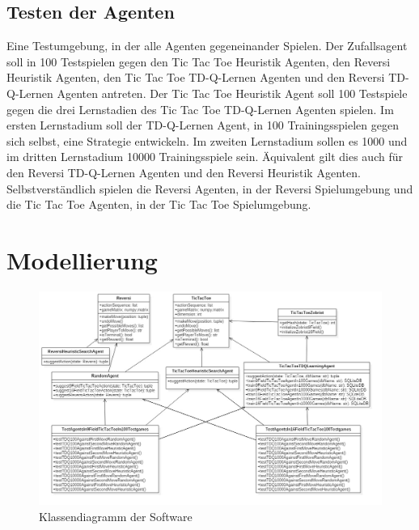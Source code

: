 \subsection{Testen der Agenten}
Eine Testumgebung, in der alle Agenten gegeneinander Spielen. Der Zufallsagent soll in 100 Testspielen gegen den Tic Tac Toe Heuristik Agenten, den Reversi Heuristik Agenten, den Tic Tac Toe TD-Q-Lernen Agenten und den Reversi TD-Q-Lernen Agenten antreten. Der Tic Tac Toe Heuristik Agent soll 100 Testspiele gegen die drei Lernstadien des Tic Tac Toe TD-Q-Lernen Agenten spielen. Im ersten Lernstadium soll der TD-Q-Lernen Agent, in 100 Trainingsspielen gegen sich selbst, eine Strategie entwickeln. Im zweiten Lernstadium sollen es 1000 und im dritten Lernstadium 10000 Trainingsspiele sein. Äquivalent gilt dies auch für den Reversi TD-Q-Lernen Agenten und den Reversi Heuristik Agenten. Selbstverständlich spielen die Reversi Agenten, in der Reversi Spielumgebung und die Tic Tac Toe Agenten, in der Tic Tac Toe Spielumgebung.
\newpage

\section{Modellierung}

\begin{figure}[!htbp]
  \centering
  \includegraphics[angle = 90, scale = 0.5]{inhalt/abbildungen/projectClassDiagram.jpg}
  \caption{Klassendiagramm der Software}
  \label{fig:klassendiagramm}
\end{figure} 
